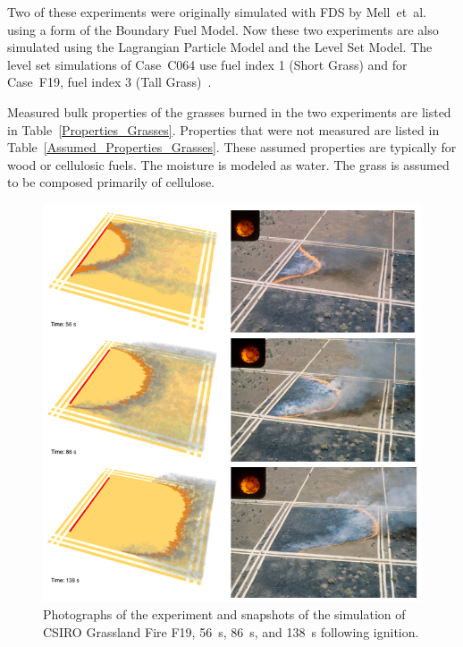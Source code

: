 \documentclass[journal,article,atmosphere,submit,moreauthors,pdftex]{Definitions/mdpi}
\begin{document}
Two of these experiments were originally simulated with FDS by Mell~et~al.~\cite{Mell:IJWF2007} using a form of the Boundary Fuel Model. Now these two experiments are also simulated using the Lagrangian Particle Model and the Level Set Model. The level set simulations of Case~C064 use fuel index 1 (Short Grass) and for Case~F19, fuel index 3 (Tall Grass)~\cite{Rothermel:1972,Albini:1976}.

Measured bulk properties of the grasses burned in the two experiments are listed in Table~\ref{Properties_Grasses}. Properties that were not measured are listed in Table~\ref{Assumed_Properties_Grasses}. These assumed properties are typically for wood or cellulosic fuels. The moisture is modeled as water. The grass is assumed to be composed primarily of cellulose.

\begin{figure}[p]
\includegraphics[width=\textwidth]{figures/F19_collage.png}
\caption{Photographs of the experiment and snapshots of the simulation of CSIRO Grassland Fire F19, 56~s, 86~s, and 138~s following ignition.}
\label{F19}
\end{figure}
\end{document}

